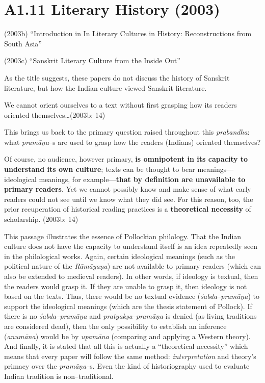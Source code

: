 {{{\vspace {-.4cm}

\section*{A1.11 Literary History (2003)}

(2003b) “Introduction in In Literary Cultures in History: Reconstructions from South Asia”

(2003c) “Sanskrit Literary Culture from the Inside Out”

As the title suggests, these papers do not discuss the history of Sanskrit literature, but how the Indian culture viewed Sanskrit literature.

\begin{myquote}
We cannot orient ourselves to a text without ﬁrst grasping how its readers oriented themselves…(2003b: 14)
\end{myquote}

This brings us back to the primary question raised throughout this \textit{prabandha}: what \textit{pramāṇa}–s are used to grasp how the readers (Indians) oriented themselves?

\begin{myquote}
Of course, no audience, however primary, \textbf{is omnipotent in its capacity to understand its own culture}; texts can be thought to bear meanings—ideological meanings, for example—\textbf{that by deﬁnition are unavailable to primary readers}. Yet we cannot possibly know and make sense of what early readers could not see until we know what they did see. For this reason, too, the prior recuperation of historical reading practices is a \textbf{theoretical necessity} of scholarship. (2003b: 14)
\end{myquote}

This passage illustrates the essence of Pollockian philology. That the Indian culture does not have the capacity to understand itself is an idea repeatedly seen in the philological works. Again, certain ideological meanings (such as the political nature of the \textit{Rāmāyaṇa}) are not available to primary readers (which can also be extended to medieval readers). In other words, if ideology is textual, then the readers would grasp it. If they are unable to grasp it, then ideology is not based on the texts. Thus, there would be no textual evidence (\textit{śabda–pramāṇa}) to support the ideological meanings (which are the thesis statement of Pollock). If there is no \textit{śabda–pramāṇa} and \textit{pratyakṣa–pramāṇa }is denied (as living traditions are considered dead), then the only possibility to establish an inference (\textit{anumāna}) would be by \textit{upamāna} (comparing and applying a Western theory). And finally, it is stated that all this is actually a “theoretical necessity” which means that every paper will follow the same method: \textit{interpretation} and theory’s primacy over the \textit{pramāṇa}–s. Even the kind of historiography used to evaluate Indian tradition is non–traditional.

}}}
